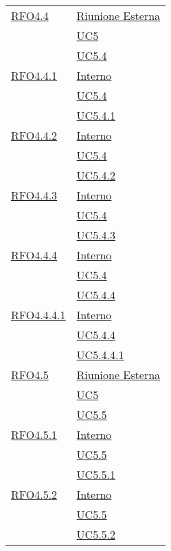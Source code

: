 \begin{longtable}{|>{\centering}m{5cm}|m{5cm}<{\centering}|}
\hyperlink{RFO4.4}{RFO4.4} & \hyperlink{Riunione Esterna}{Riunione Esterna}\\
& \hyperref[UC5]{UC5}\\
& \hyperref[UC5.4]{UC5.4}\\ \hline

\hyperlink{RFO4.4.1}{RFO4.4.1} & \hyperlink{Interno}{Interno}\\
& \hyperref[UC5.4]{UC5.4}\\
& \hyperref[UC5.4.1]{UC5.4.1}\\ \hline

\hyperlink{RFO4.4.2}{RFO4.4.2} & \hyperlink{Interno}{Interno}\\
& \hyperref[UC5.4]{UC5.4}\\
& \hyperref[UC5.4.2]{UC5.4.2}\\ \hline

\hyperlink{RFO4.4.3}{RFO4.4.3} & \hyperlink{Interno}{Interno}\\
& \hyperref[UC5.4]{UC5.4}\\
& \hyperref[UC5.4.3]{UC5.4.3}\\ \hline

\hyperlink{RFO4.4.4}{RFO4.4.4} & \hyperlink{Interno}{Interno}\\
& \hyperref[UC5.4]{UC5.4}\\
& \hyperref[UC5.4.4]{UC5.4.4}\\ \hline

\hyperlink{RFO4.4.4.1}{RFO4.4.4.1} & \hyperlink{Interno}{Interno}\\
& \hyperref[UC5.4.4]{UC5.4.4}\\
& \hyperref[UC5.4.4.1]{UC5.4.4.1}\\ \hline

\hyperlink{RFO4.5}{RFO4.5} & \hyperlink{Riunione Esterna}{Riunione Esterna}\\
& \hyperref[UC5]{UC5}\\
& \hyperref[UC5.5]{UC5.5}\\ \hline

\hyperlink{RFO4.5.1}{RFO4.5.1} & \hyperlink{Interno}{Interno}\\
& \hyperref[UC5.5]{UC5.5}\\
& \hyperref[UC5.5.1]{UC5.5.1}\\ \hline

\hyperlink{RFO4.5.2}{RFO4.5.2} & \hyperlink{Interno}{Interno}\\
& \hyperref[UC5.5]{UC5.5}\\
& \hyperref[UC5.5.2]{UC5.5.2}\\ \hline


\end{longtable}
